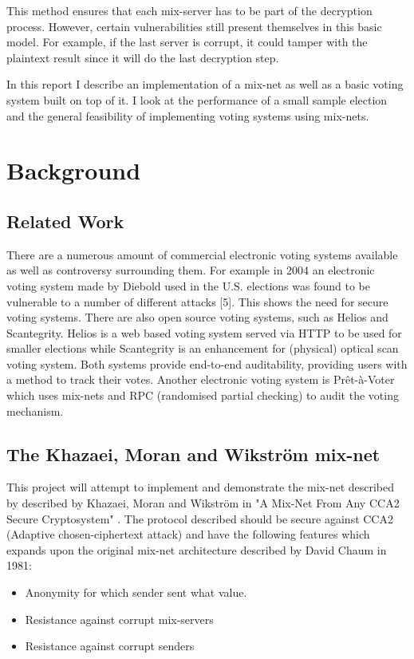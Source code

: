 \documentclass[a4paper,11pt]{kth-mag}
\begin{document}
This method ensures that each mix-server has to be part of the decryption process. However, certain vulnerabilities still present themselves in this basic model. For example, if the last server is corrupt, it could tamper with the plaintext result since it will do the last decryption step.

In this report I describe an implementation of a mix-net as well as a basic voting system built on top of it. I look at the performance of a small sample election and the general feasibility of implementing voting systems using mix-nets. 

\chapter{Background}
\section{Related Work}
There are a numerous amount of commercial electronic voting systems available as well as controversy surrounding them. For example in 2004 an electronic voting system made by Diebold used in the U.S. elections was found to be vulnerable to a number of different attacks [5]. This shows the need for secure voting systems. There are also open source voting systems, such as Helios\cite{10} and Scantegrity\cite{11}.  Helios is a web based voting system served via HTTP to be used for smaller elections while Scantegrity is an enhancement for (physical) optical scan voting system. Both systems provide end-to-end auditability, providing users with a method to track their votes. Another electronic voting system is Prêt-à-Voter\cite{12} which uses mix-nets and RPC (randomised partial checking) to audit the voting mechanism.

\section{The Khazaei, Moran and Wikström mix-net}
This project will attempt to implement and demonstrate the mix-net described by described by Khazaei, Moran and Wikström in "A Mix-Net From Any CCA2 Secure Cryptosystem" \cite{4} . The protocol described should be secure against CCA2 (Adaptive chosen-ciphertext attack) and have the following features which expands upon the original mix-net architecture described by David Chaum in 1981\cite{1}:
\begin{itemize}
	\item Anonymity for which sender sent what value.
	\item Resistance against corrupt mix-servers
	\item Resistance against corrupt senders
\end{itemize}
\end{document}
